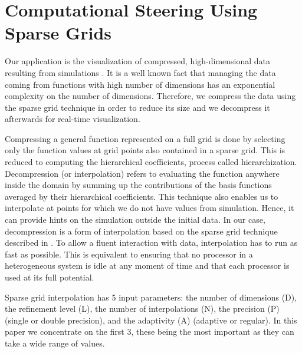 \section{Computational Steering Using Sparse Grids}


Our application is the visualization of compressed, high-dimensional data
resulting from simulations \cite{butnaru2011}. It is a well known fact that
managing the data coming from functions with high number of dimensions has an
exponential complexity on the number of dimensions. Therefore, we compress the
data using the sparse grid technique in order to reduce its size and we
decompress it afterwards for real-time visualization. 

Compressing a general function represented on a full grid is done by selecting
only the function values at grid points also contained in a sparse grid. This is
reduced to computing the hierarchical coefficients, process called
hierarchization. Decompression (or interpolation) refers to evaluating the
function anywhere inside the domain by summing up the contributions of the basis
functions averaged by their hierarchical coefficients. This technique also
enables us to interpolate at points for which we do not have values from
simulation. Hence, it can provide hints on the simulation outside the initial
data. In our case, decompression is a form of interpolation based on the sparse
grid technique described in \cite{bungartz2004}. To allow a fluent interaction
with data, interpolation has to run as fast as possible. This is equivalent to
ensuring that no processor in a heterogeneous system is idle at any moment of
time and that each processor is used at its full potential.

Sparse grid interpolation has 5 input parameters: the number of dimensions (D),
the refinement level (L), the number of interpolations (N), the precision (P)
(single or double precision), and the adaptivity (A) (adaptive or regular). In
this paper we concentrate on the first 3, these being the most important as they
can take a wide range of values.

